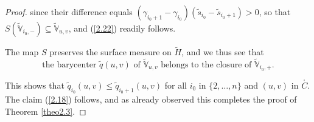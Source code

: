 \documentclass[10pt,a4paper]{amsart}
\def\IV{{\mathbb V}}
\def\n{\noindent}
\def\wt{\widetilde}
\begin{document}
\begin{proof}
\n
since  their difference equals $(\gamma_{i_0 + 1} - \gamma_{i_0}) (\wt{s}_{i_0} - \wt{s}_{i_0 + 1}) > 0$, so that $S(\wt{\IV}_{i_0, -}) \subseteq \wt{\IV}_{u,v}$, and (\ref{2.22}) readily follows.

\medskip
The map $S$ preserves the surface measure on $\wt{H}$, and we thus see that
\begin{equation}\label{2.24}
\mbox{the barycenter $\wt{q}(u,v)$ of $\wt{\IV}_{u,v}$ belongs to the closure of $\wt{\IV}_{i_0, +}$}.
\end{equation}

\n
This shows that $\wt{q}_{i_0}(u,v) \le \wt{q}_{i_0 + 1}(u,v)$ for all $i_0$ in $\{2,\dots,n\}$ and $(u,v)$ in $\stackrel{_\circ}{C}$. The claim (\ref{2.18}) follows, and as already observed this completes the proof of Theorem \ref{theo2.3}.
\end{proof}
\end{document}
